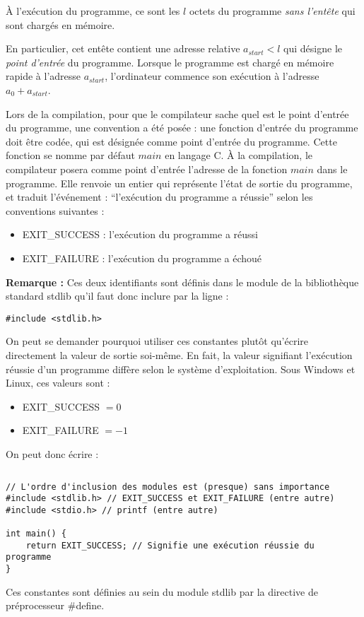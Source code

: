 \documentclass[../../../main.tex]{subfiles}
\begin{document}
À l'exécution du programme, ce sont les $l$ octets du programme \textit{sans l'entête} qui sont chargés en mémoire.

\begin{minipage}{\textwidth}
	\begin{center}
		
		\label{img:prgm}
	\end{center}
\end{minipage}

En particulier, cet entête contient une adresse relative $a_{start} < l$ qui désigne le \textit{point d'entrée} du programme. Lorsque le programme est chargé en mémoire rapide à l'adresse $a_{start}$, l'ordinateur commence son exécution à l'adresse $a_{0} + a_{start}$.
 
Lors de la compilation, pour que le compilateur sache quel est le point d'entrée du programme, une convention a été posée : une fonction d'entrée du programme doit être codée, qui est désignée comme point d'entrée du programme. Cette fonction se nomme par défaut $main$ en langage C. À la compilation, le compilateur posera comme point d'entrée l'adresse de la fonction $main$ dans le programme. Elle renvoie un entier qui représente l'état de sortie du programme, et traduit l'événement : ``l'exécution du programme a réussie'' selon les conventions suivantes :
\begin{itemize}
	\item \textsf{EXIT\_SUCCESS} : l'exécution du programme a réussi
	\item \textsf{EXIT\_FAILURE} : l'exécution du programme a échoué
\end{itemize}
\textbf{Remarque :} Ces deux identifiants sont définis dans le module de la bibliothèque standard \textsf{stdlib} qu'il faut donc inclure par la ligne :
\begin{verbatim}
#include <stdlib.h>
\end{verbatim}
On peut se demander pourquoi utiliser ces constantes plutôt qu'écrire directement la valeur de sortie soi-même. En fait, la valeur signifiant l'exécution réussie d'un programme diffère selon le système d'exploitation. Sous Windows et Linux, ces valeurs sont :
\begin{itemize}
	\item \textsf{EXIT\_SUCCESS} $ = 0$
	\item \textsf{EXIT\_FAILURE} $ = -1$
\end{itemize}
On peut donc écrire :
\begin{lstlisting}[title=Exemple]
\end{lstlisting}
\begin{verbatim}
// L'ordre d'inclusion des modules est (presque) sans importance
#include <stdlib.h> // EXIT_SUCCESS et EXIT_FAILURE (entre autre)
#include <stdio.h> // printf (entre autre)

int main() {
	return EXIT_SUCCESS; // Signifie une exécution réussie du programme
}
\end{verbatim}
Ces constantes sont définies au sein du module \textsf{stdlib} par la directive de préprocesseur \textsf{\#define}.
\end{document}
